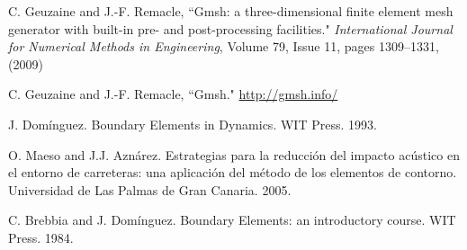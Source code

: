 \documentclass[a4]{article}
\begin{document}
\begin{thebibliography}{99}
	 C. Geuzaine and J.-F. Remacle, ``Gmsh: a three-dimensional finite element mesh generator with built-in pre- and post-processing facilities." \textit{International Journal for Numerical Methods in Engineering}, Volume 79, Issue 11, pages 1309--1331, (2009)
	
	 C. Geuzaine and J.-F. Remacle, ``Gmsh." \url{http://gmsh.info/}
	
	 J. Domínguez. Boundary Elements in Dynamics. WIT Press. 1993.
	
	 O. Maeso and J.J. Aznárez. Estrategias para la reducción del impacto acústico en el entorno de carreteras: una aplicación del método de los elementos de contorno. Universidad de Las Palmas de Gran Canaria. 2005.

	 C. Brebbia and J. Domínguez. Boundary Elements: an introductory course. WIT Press. 1984.
	
\end{thebibliography}
\end{document}
